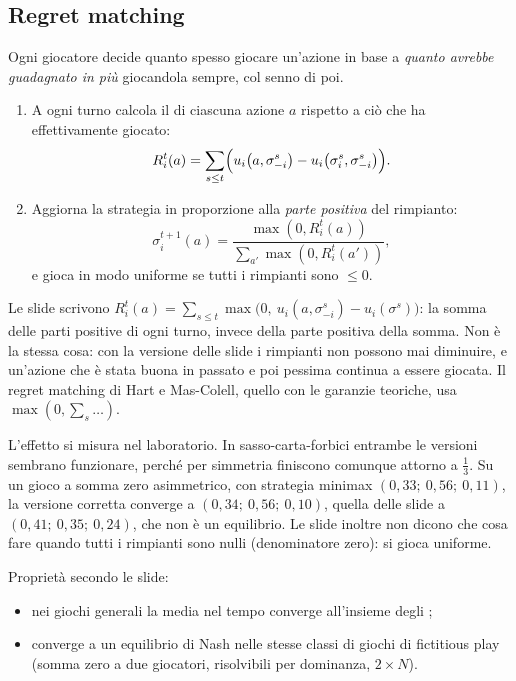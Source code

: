 \subsection{Regret matching}

Ogni giocatore decide quanto spesso giocare un'azione in base a \emph{quanto avrebbe
guadagnato in più} giocandola sempre, col senno di poi.
\begin{enumerate}
  \item A ogni turno calcola il  di ciascuna azione $a$ rispetto a
        ciò che ha effettivamente giocato:
        \[
          R_i^t(a) = \sum_{s \le t} \Bigl( u_i\bigl(a, \sigma_{-i}^s\bigr)
                     - u_i\bigl(\sigma_i^s, \sigma_{-i}^s\bigr) \Bigr).
        \]
  \item Aggiorna la strategia in proporzione alla \emph{parte positiva} del rimpianto:
        \[
          \sigma_i^{t+1}(a) = \frac{\max(0, R_i^t(a))}{\sum_{a'} \max(0, R_i^t(a'))},
        \]
        e gioca in modo uniforme se tutti i rimpianti sono $\le 0$.
\end{enumerate}

\begin{attenzione}
Le slide scrivono $R_i^t(a) = \sum_{s \le t} \max\bigl(0,\ u_i(a,\sigma_{-i}^s) -
u_i(\sigma^s)\bigr)$: la somma delle parti positive di ogni turno, invece della parte
positiva della somma. Non è la stessa cosa: con la versione delle slide i rimpianti non
possono mai diminuire, e un'azione che è stata buona in passato e poi pessima continua a
essere giocata. Il regret matching di Hart e Mas-Colell, quello con le garanzie
teoriche, usa $\max(0, \sum_s \dots)$.

L'effetto si misura nel laboratorio. In sasso-carta-forbici entrambe le versioni sembrano
funzionare, perché per simmetria finiscono comunque attorno a $\tfrac13$. Su un gioco a
somma zero asimmetrico, con strategia minimax $(0{,}33;\ 0{,}56;\ 0{,}11)$, la versione
corretta converge a $(0{,}34;\ 0{,}56;\ 0{,}10)$, quella delle slide a
$(0{,}41;\ 0{,}35;\ 0{,}24)$, che non è un equilibrio. Le slide inoltre non dicono che
cosa fare quando tutti i rimpianti sono nulli (denominatore zero): si gioca uniforme.
\end{attenzione}

Proprietà secondo le slide:
\begin{itemize}
  \item nei giochi generali la media nel tempo converge all'insieme degli
        ;
  \item converge a un equilibrio di Nash nelle stesse classi di giochi di fictitious play
        (somma zero a due giocatori, risolvibili per dominanza, $2\times N$).
\end{itemize}


